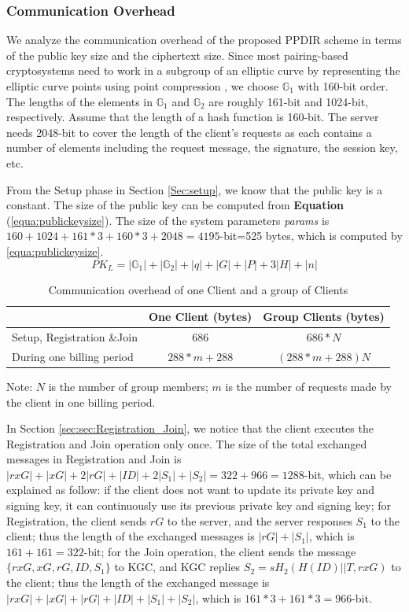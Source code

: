 \documentclass[letterpaper,12pt]{article}
\begin{document}
\subsubsection{Communication Overhead}
We analyze the communication overhead of the proposed PPDIR scheme in terms of the public key size and the ciphertext size. Since most pairing-based cryptosystems need to work in a subgroup of an elliptic curve by representing the elliptic curve points using point compression \cite{blake2005advances}, we choose $\mathbb{G}_1$ with 160-bit order. The lengths of the elements in $\mathbb{G}_1$ and $\mathbb{G}_2$ are roughly 161-bit and 1024-bit, respectively.   Assume that the length of a hash function is 160-bit. The server needs 2048-bit to cover the length of the client's requests as each contains a number of elements including the request message, the signature, the session key, etc.

From the Setup phase in Section \ref{Sec:setup}, we know that the public key is a constant. The size of the public key can be computed from \textbf{Equation} (\ref{equa:publickeysize}). The size of the system parameters \emph{params} is $160+1024+161*3+160*3+2048=4195$-bit=525 bytes, which is computed by \eqref{equa:publickeysize}.
\begin{equation}\label{equa:publickeysize}
PK_L=|\mathbb{G}_1|+|\mathbb{G}_2|+|q|+|G|+|P|+3|H|+|n|
\end{equation}

 \begin{table}[!htb]
\caption{Communication overhead of one Client and a group of Clients}\label{tab:Communicationoverhead:clients}
\centering
\begin{threeparttable}
\begin{tabular}{ l | c | c }
\hline
& One Client (bytes) & Group Clients (bytes)\\
\hline
Setup, Registration \&Join& $686$ & $686*N$ \\
\hline
During one  billing period& $288*m+288$ & $(288*m+288)N$ \\
\hline
\end{tabular}
 Note: $N$ is the number of group members; $m$ is the number of requests made by the client  in one billing period.
\end{threeparttable}
\end{table}

In Section \ref{sec:sec:Registration_Join}, we notice that the client executes the Registration and Join operation only once. The size of the total exchanged messages in Registration and Join is $|rxG|+|xG|+2|rG|+|ID|+2|S_1|+|S_2|=322+966=1288$-bit, which can be explained as follow: if the client does not want to update its private key and signing key, it can continuously use its previous private key and signing key; for Registration, the client sends $rG$ to the server, and the server responses $S_1$ to the client; thus the length of the exchanged messages is $|rG|+|S_1|$, which is $161+161=322$-bit; for the Join operation, the client sends the message $\{rxG, xG, rG, ID, S_1\}$ to KGC, and KGC replies $S_2=sH_2(H(ID)||T,rxG)$ to the client; thus the length of the exchanged message is $|rxG|+|xG|+|rG|+|ID|+|S_1|+|S_2|$, which is $161*3+161*3=966$-bit.
\end{document}
